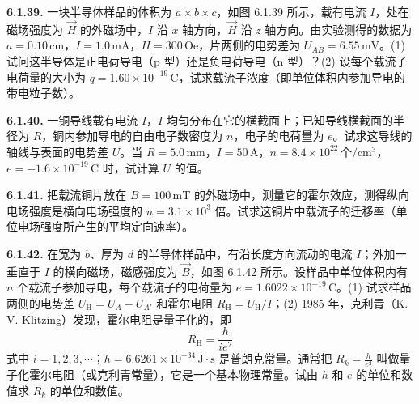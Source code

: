 \begin{center}
\end{center}

\vfill
\newpage

\textbf{6.1.39.} 一块半导体样品的体积为 $a \times b \times c$，如图 6.1.39 所示，载有电流 $I$，处在磁场强度为 $\vec{H}$ 的外磁场中，$I$ 沿 $x$ 轴方向，$\vec{H}$ 沿 $z$ 轴方向。由实验测得的数据为 $a = 0.10\,\mathrm{cm}$，$I = 1.0\,\mathrm{mA}$，$H = 300\,\mathrm{Oe}$，片两侧的电势差为 $U_{AB} = 6.55\,\mathrm{mV}$。(1) 试问这半导体是正电荷导电（p 型）还是负电荷导电（n 型）？(2) 设每个载流子电荷量的大小为 $q = 1.60 \times 10^{-19}\,\mathrm{C}$，试求载流子浓度（即单位体积内参加导电的带电粒子数）。

\begin{center}
\end{center}

\vfill
\newpage

\textbf{6.1.40.} 一铜导线载有电流 $I$，$I$ 均匀分布在它的横截面上；已知导线横截面的半径为 $R$，铜内参加导电的自由电子数密度为 $n$，电子的电荷量为 $e$。试求这导线的轴线与表面的电势差 $U$。当 $R = 5.0\,\mathrm{mm}$，$I = 50\,\mathrm{A}$，$n = 8.4 \times 10^{22}\,\text{个}/\mathrm{cm}^{3}$，$e = -1.6 \times 10^{-19}\,\mathrm{C}$ 时，试计算 $U$ 的值。

\vfill
\newpage

\textbf{6.1.41.} 把载流铜片放在 $B = 100\,\mathrm{mT}$ 的外磁场中，测量它的霍尔效应，测得纵向电场强度是横向电场强度的 $n = 3.1 \times 10^{3}$ 倍。试求这铜片中载流子的迁移率（单位电场强度所产生的平均定向速率）。

\vfill
\newpage

\textbf{6.1.42.} 在宽为 $b$、厚为 $d$ 的半导体样品中，有沿长度方向流动的电流 $I$；外加一垂直于 $I$ 的横向磁场，磁感强度为 $\vec{B}$，如图 6.1.42 所示。设样品中单位体积内有 $n$ 个载流子参加导电，每个载流子的电荷量为 $e = 1.6022 \times 10^{-19}\,\mathrm{C}$。(1) 试求样品两侧的电势差 $U_{\mathrm{H}} = U_{A} - U_{A'}$ 和霍尔电阻 $R_{\mathrm{H}} = U_{\mathrm{H}}/I$；(2) 1985 年，克利青（K. V. Klitzing）发现，霍尔电阻是量子化的，即
\[
R_{\mathrm{H}} = \frac{h}{i e^{2}}
\]
式中 $i = 1, 2, 3, \cdots$；$h = 6.6261 \times 10^{-34}\,\mathrm{J\cdot s}$ 是普朗克常量。通常把 $\displaystyle R_{k} = \frac{h}{e^{2}}$ 叫做量子化霍尔电阻（或克利青常量），它是一个基本物理常量。试由 $h$ 和 $e$ 的单位和数值求 $R_{k}$ 的单位和数值。

\begin{center}
\end{center}

